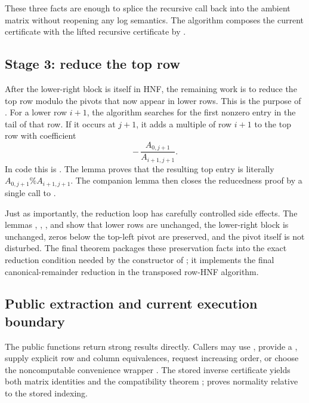 These three facts are enough to splice the recursive call back into the ambient
matrix without reopening any log semantics. The algorithm composes the current
certificate with the lifted recursive certificate by .

\subsection{Stage 3: reduce the top row}

After the lower-right block is itself in HNF, the remaining work is to reduce the
top row modulo the pivots that now appear in lower rows. This is the purpose of
. For a lower row \(i+1\), the algorithm searches for the
first nonzero entry in the tail of that row. If it occurs at \(j+1\), it adds a
multiple of row \(i+1\) to the top row with coefficient
\[
  -\,\frac{A_{0,j+1}}{A_{i+1,j+1}}.
\]
In code this is . The lemma
 proves that the resulting top entry is
literally \(A_{0,j+1} \% A_{i+1,j+1}\). The companion lemma
 then closes the reducedness proof by a
single call to .

Just as importantly, the reduction loop has carefully controlled side effects.
The lemmas ,
, , and
 show that lower rows are unchanged, the
lower-right block is unchanged, zeros below the top-left pivot are preserved, and
the pivot itself is not disturbed. The final theorem
 packages these preservation facts into
the exact reduction condition needed by the  constructor of
; it implements the final canonical-remainder
reduction in the transposed row-HNF algorithm.

\subsection{Public extraction and current execution boundary}

The public functions return strong results directly. Callers may use
, provide a , supply explicit
row and column equivalences, request increasing order, or choose the
noncomputable convenience wrapper . The stored inverse
certificate yields both matrix identities and the compatibility theorem
;  proves
normality relative to the stored indexing.

